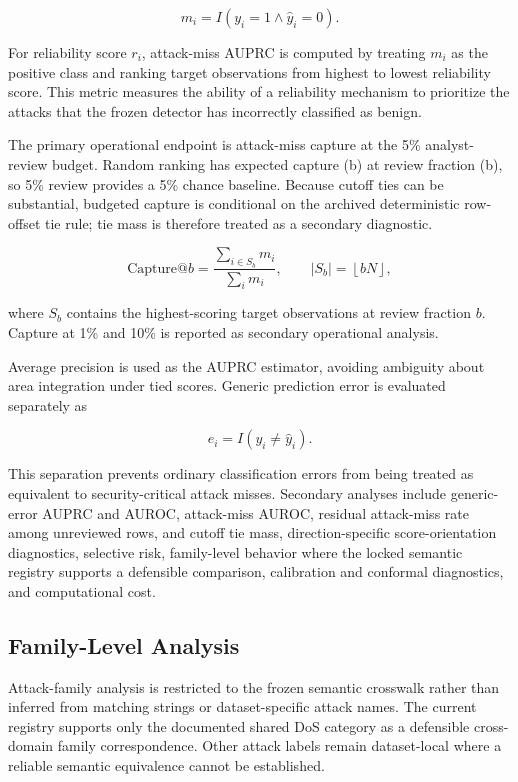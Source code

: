 \documentclass[conference]{IEEEtran}
\begin{document}
\[
m_i
=
I\left(y_i=1\land\hat{y}_i=0\right).
\]

For reliability score \(r_i\), attack-miss AUPRC is computed by treating \(m_i\) as the positive class and ranking target observations from highest to lowest reliability score. This metric measures the ability of a reliability mechanism to prioritize the attacks that the frozen detector has incorrectly classified as benign.

The primary operational endpoint is attack-miss capture at the 5\% analyst-review budget. Random ranking has expected capture (b) at review fraction (b), so 5\% review provides a 5\% chance baseline. Because cutoff ties can be substantial, budgeted capture is conditional on the archived deterministic row-offset tie rule; tie mass is therefore treated as a secondary diagnostic.

\[
\mathrm{Capture}@b
=
\frac{\sum_{i\in S_b}m_i}
{\sum_i m_i},
\qquad
|S_b|=\left\lfloor bN\right\rfloor,
\]

where \(S_b\) contains the highest-scoring target observations at review fraction \(b\). Capture at 1\% and 10\% is reported as secondary operational analysis.

Average precision is used as the AUPRC estimator, avoiding ambiguity about area integration under tied scores. Generic prediction error is evaluated separately as

\[
e_i=I\left(y_i\ne\hat{y}_i\right).
\]

This separation prevents ordinary classification errors from being treated as equivalent to security-critical attack misses. Secondary analyses include generic-error AUPRC and AUROC, attack-miss AUROC, residual attack-miss rate among unreviewed rows, and cutoff tie mass, direction-specific score-orientation diagnostics, selective risk, family-level behavior where the locked semantic registry supports a defensible comparison, calibration and conformal diagnostics, and computational cost.

\subsection{Family-Level Analysis}

Attack-family analysis is restricted to the frozen semantic crosswalk rather than inferred from matching strings or dataset-specific attack names. The current registry supports only the documented shared DoS category as a defensible cross-domain family correspondence. Other attack labels remain dataset-local where a reliable semantic equivalence cannot be established.
\end{document}
